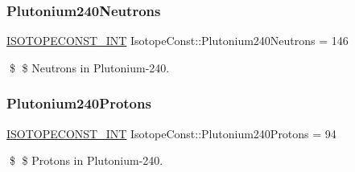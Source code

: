 \subsubsection{\texorpdfstring{Plutonium240\+Neutrons}{Plutonium240Neutrons}}
{\footnotesize\ttfamily \mbox{\hyperlink{group___isotope_const-_macros_ga5f18360b3e99483a35c32d789e62621c}{I\+S\+O\+T\+O\+P\+E\+C\+O\+N\+S\+T\+\_\+\+I\+NT}} Isotope\+Const\+::\+Plutonium240\+Neutrons = 146}

\$ \$ Neutrons in Plutonium-\/240. \mbox{\label{group___isotope_const-_plutonium-_pu240_gaa6046cdb1bb6137a0f2e958d3499d164}} 
\subsubsection{\texorpdfstring{Plutonium240\+Protons}{Plutonium240Protons}}
{\footnotesize\ttfamily \mbox{\hyperlink{group___isotope_const-_macros_ga5f18360b3e99483a35c32d789e62621c}{I\+S\+O\+T\+O\+P\+E\+C\+O\+N\+S\+T\+\_\+\+I\+NT}} Isotope\+Const\+::\+Plutonium240\+Protons = 94}

\$ \$ Protons in Plutonium-\/240. 